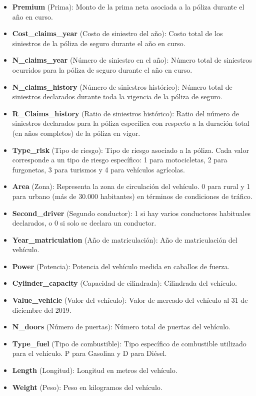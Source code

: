 \documentclass[
  spanish,
  11pt,
  letterpaper,
]{article}
\begin{document}
\begin{itemize}
  \textbf{Payment} (Método de pago): Último método de pago de la póliza
  de referencia. El 1 representa un proceso administrativo semestral y 0
  indica un método de pago anual.
\item
  \textbf{Premium} (Prima): Monto de la prima neta asociada a la póliza
  durante el año en curso.
\item
  \textbf{Cost\_claims\_year} (Costo de siniestro del año): Costo total
  de los siniestros de la póliza de seguro durante el año en curso.
\item
  \textbf{N\_claims\_year} (Número de siniestro en el año): Número total
  de siniestros ocurridos para la póliza de seguro durante el año en
  curso.
\item
  \textbf{N\_claims\_history} (Número de siniestros histórico): Número
  total de siniestros declarados durante toda la vigencia de la póliza
  de seguro.
\item
  \textbf{R\_Claims\_history} (Ratio de siniestros histórico): Ratio del
  número de siniestros declarados para la póliza específica con respecto
  a la duración total (en años completos) de la póliza en vigor.
\item
  \textbf{Type\_risk} (Tipo de riesgo): Tipo de riesgo asociado a la
  póliza. Cada valor corresponde a un tipo de riesgo específico: 1 para
  motocicletas, 2 para furgonetas, 3 para turismos y 4 para vehículos
  agrícolas.
\item
  \textbf{Area} (Zona): Representa la zona de circulación del vehículo.
  0 para rural y 1 para urbano (más de 30.000 habitantes) en términos de
  condiciones de tráfico.
\item
  \textbf{Second\_driver} (Segundo conductor): 1 si hay varios
  conductores habituales declarados, o 0 si solo se declara un
  conductor.
\item
  \textbf{Year\_matriculation} (Año de matriculación): Año de
  matriculación del vehículo.
\item
  \textbf{Power} (Potencia): Potencia del vehículo medida en caballos de
  fuerza.
\item
  \textbf{Cylinder\_capacity} (Capacidad de cilindrada): Cilindrada del
  vehículo.
\item
  \textbf{Value\_vehicle} (Valor del vehículo): Valor de mercado del
  vehículo al 31 de diciembre del 2019.
\item
  \textbf{N\_doors} (Número de puertas): Número total de puertas del
  vehículo.
\item
  \textbf{Type\_fuel} (Tipo de combustible): Tipo específico de
  combustible utilizado para el vehículo. P para Gasolina y D para
  Diésel.
\item
  \textbf{Length} (Longitud): Longitud en metros del vehículo.
\item
  \textbf{Weight} (Peso): Peso en kilogramos del vehículo.
\end{itemize}
\end{document}
